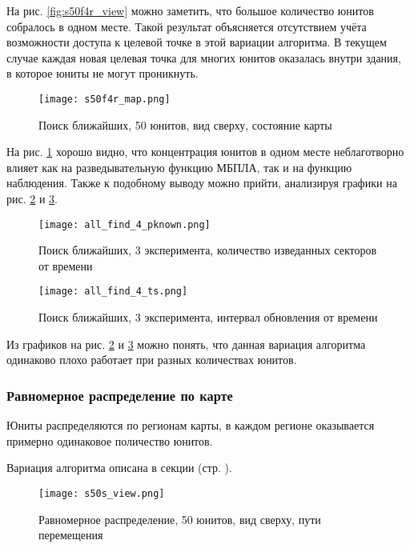 На рис. \ref{fig:s50f4r_view} можно заметить, что большое количество
юнитов собралось в одном месте. Такой результат объясняется отсутствием
учёта возможности доступа к целевой точке в этой вариации алгоритма.
В текущем случае каждая новая целевая точка для многих юнитов оказалась
внутри здания, в которое юниты не могут проникнуть.

\begin{figure}[h!]
    \centering
    \texttt{[image: s50f4r\_map.png]}
    \caption{Поиск ближайших, 50 юнитов, вид сверху, состояние карты}
    \label{fig:s50f4r_map}
\end{figure}

На рис. \ref{fig:s50f4r_map} хорошо видно, что концентрация юнитов в
одном месте неблаготворно влияет как на разведывательную функцию МБПЛА,
так и на функцию наблюдения. Также к подобному выводу можно прийти,
анализируя графики на рис. \ref{fig:all_f4r_pk} и \ref{fig:all_f4r_ts}.

\begin{figure}[h!]
    \centering
    \texttt{[image: all\_find\_4\_pknown.png]}
    \caption{Поиск ближайших, 3 эксперимента, количество изведанных секторов от времени}
    \label{fig:all_f4r_pk}
\end{figure}

\clearpage

\begin{figure}[h!]
    \centering
    \texttt{[image: all\_find\_4\_ts.png]}
    \caption{Поиск ближайших, 3 эксперимента, интервал обновления от времени}
    \label{fig:all_f4r_ts}
\end{figure}

Из графиков на рис. \ref{fig:all_f4r_pk} и \ref{fig:all_f4r_ts} можно понять,
что данная вариация алгоритма одинаково плохо работает при разных количествах
юнитов.

\clearpage
\newpage

\subsubsection{Равномерное распределение по карте}

Юниты распределяются по регионам карты, в каждом регионе
оказывается примерно одинаковое поличество юнитов.

Вариация алгоритма описана в секции 
(стр. \pageref{ref:algo:choise:serial}).

\begin{figure}[h!]
    \centering
    \texttt{[image: s50s\_view.png]}
    \caption{Равномерное распределение, 50 юнитов, вид сверху, пути перемещения}
    \label{fig:s50s_view}
\end{figure}

